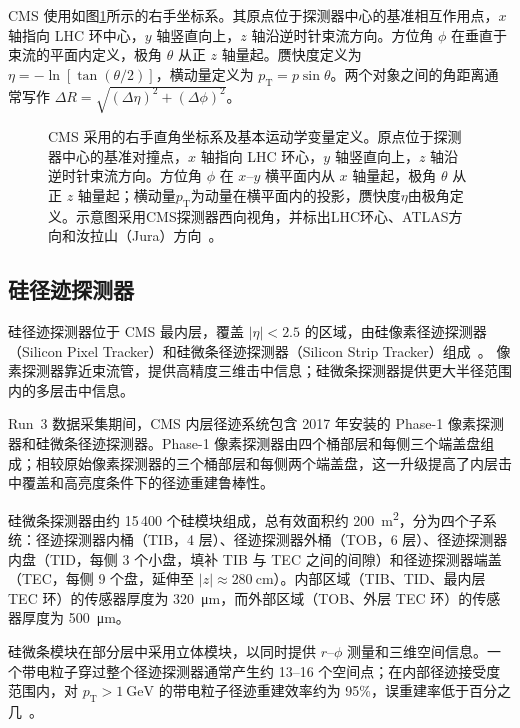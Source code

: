 CMS 使用如图\ref{fig:chap03-cms-coordinate}所示的右手坐标系。其原点位于探测器中心的基准相互作用点，$x$ 轴指向 LHC 环中心，$y$ 轴竖直向上，$z$ 轴沿逆时针束流方向。方位角 $\phi$ 在垂直于束流的平面内定义，极角 $\theta$ 从正 $z$ 轴量起。赝快度定义为 $\eta=-\ln[\tan(\theta/2)]$，横动量定义为 $p_{\mathrm{T}}=p\sin\theta$。两个对象之间的角距离通常写作 $\Delta R=\sqrt{(\Delta\eta)^2+(\Delta\phi)^2}$。


\begin{figure}
  \centering
  \resizebox{0.82\textwidth}{!}{%
  }
  \caption[CMS 坐标系及基本运动学变量定义]{CMS 采用的右手直角坐标系及基本运动学变量定义。原点位于探测器中心的基准对撞点，$x$ 轴指向 LHC 环心，$y$ 轴竖直向上，$z$ 轴沿逆时针束流方向。方位角 $\phi$ 在 $x$--$y$ 横平面内从 $x$ 轴量起，极角 $\theta$ 从正 $z$ 轴量起；横动量$p_{\mathrm T}$为动量在横平面内的投影，赝快度$\eta$由极角定义。示意图采用CMS探测器西向视角，并标出LHC环心、ATLAS方向和汝拉山（Jura）方向~\cite{NeutelingsTikZCMSCoordinates}。}
  \label{fig:chap03-cms-coordinate}
\end{figure}

\subsection{硅径迹探测器}

硅径迹探测器位于 CMS 最内层，覆盖 $|\eta|<2.5$ 的区域，由硅像素径迹探测器（Silicon Pixel Tracker）和硅微条径迹探测器（Silicon Strip Tracker）组成~\cite{CMS_JINST_2008,CMS_TDR_CH6_TRACKING,CMSTrackerOperationPerformance2025}。
像素探测器靠近束流管，提供高精度三维击中信息；硅微条探测器提供更大半径范围内的多层击中信息。

Run~3 数据采集期间，CMS 内层径迹系统包含 2017 年安装的 Phase-1 像素探测器和硅微条径迹探测器。Phase-1 像素探测器由四个桶部层和每侧三个端盖盘组成；相较原始像素探测器的三个桶部层和每侧两个端盖盘，这一升级提高了内层击中覆盖和高亮度条件下的径迹重建鲁棒性。

硅微条探测器由约 15\,400 个硅模块组成，总有效面积约 \SI{200}{\meter\squared}，分为四个子系统：径迹探测器内桶（TIB，4 层）、径迹探测器外桶（TOB，6 层）、径迹探测器内盘（TID，每侧 3 个小盘，填补 TIB 与 TEC 之间的间隙）和径迹探测器端盖（TEC，每侧 9 个盘，延伸至 $|z| \approx \SI{280}{\centi\meter}$）。内部区域（TIB、TID、最内层 TEC 环）的传感器厚度为 \SI{320}{\micro\meter}，而外部区域（TOB、外层 TEC 环）的传感器厚度为 \SI{500}{\micro\meter}。

硅微条模块在部分层中采用立体模块，以同时提供 $r$--$\phi$ 测量和三维空间信息。一个带电粒子穿过整个径迹探测器通常产生约 13--16 个空间点；在内部径迹接受度范围内，对 $p_{\mathrm{T}} > \SI{1}{\giga\eV}$ 的带电粒子径迹重建效率约为 95\%，误重建率低于百分之几~\cite{CMS_TDR_CH6_TRACKING}。

